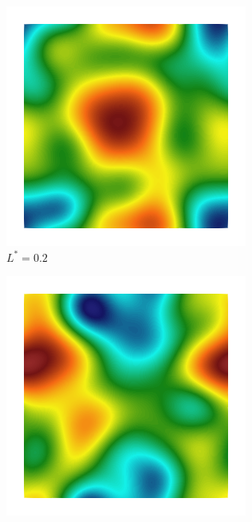 \begin{figure}[!htbp]
  \begin{subfigure}[b]{0.15\textwidth}
    \includegraphics[width=\textwidth]{Chapter4/figures/2D/Gc_sqexp_cartesian_20_20_rho_0_seed_a.png}
    \caption{$L^* = 0.2$}
    \label{fig: Chapter4/2D/Gc_sqexp_cartesian_20_20_rho_0_seed_a}
  \end{subfigure}
  \begin{subfigure}[b]{0.15\textwidth}
    \includegraphics[width=\textwidth]{Chapter4/figures/2D/psic_sqexp_cartesian_20_20_rho_0_seed_a.png}

\end{subfigure}
\end{figure}
